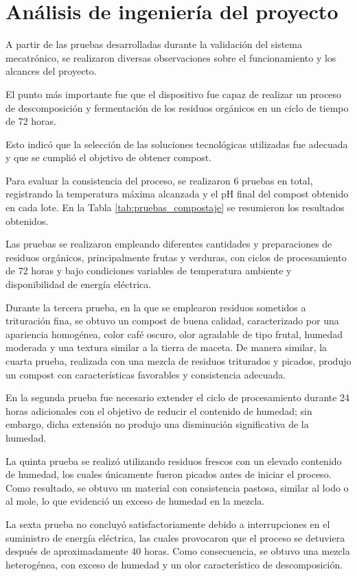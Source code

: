 \section{Análisis de ingeniería del proyecto}

A partir de las pruebas desarrolladas durante la validación del sistema mecatrónico, se realizaron diversas observaciones sobre el funcionamiento y los alcances del proyecto.

El punto más importante fue que el dispositivo fue capaz de realizar un proceso de descomposición y fermentación de los residuos orgánicos en un ciclo de tiempo de 72 horas.

Esto indicó que la selección de las soluciones tecnológicas utilizadas fue adecuada y que se cumplió el objetivo de obtener compost.

Para evaluar la consistencia del proceso, se realizaron 6 pruebas en total, registrando la temperatura máxima alcanzada y el pH final del compost obtenido en cada lote. En la Tabla \ref{tab:pruebas_compostaje} se resumieron los resultados obtenidos.
\clearpage

Las pruebas se realizaron empleando diferentes cantidades y preparaciones de residuos orgánicos, principalmente frutas y verduras, con ciclos de procesamiento de 72 horas y bajo condiciones variables de temperatura ambiente y disponibilidad de energía eléctrica.

Durante la tercera prueba, en la que se emplearon residuos sometidos a trituración fina, se obtuvo un compost de buena calidad, caracterizado por una apariencia homogénea, color café oscuro, olor agradable de tipo frutal, humedad moderada y una textura similar a la tierra de maceta. De manera similar, la cuarta prueba, realizada con una mezcla de residuos triturados y picados, produjo un compost con características favorables y consistencia adecuada.

En la segunda prueba fue necesario extender el ciclo de procesamiento durante 24 horas adicionales con el objetivo de reducir el contenido de humedad; sin embargo, dicha extensión no produjo una disminución significativa de la humedad.

La quinta prueba se realizó utilizando residuos frescos con un elevado contenido de humedad, los cuales únicamente fueron picados antes de iniciar el proceso. Como resultado, se obtuvo un material con consistencia pastosa, similar al lodo o al mole, lo que evidenció un exceso de humedad en la mezcla.

La sexta prueba no concluyó satisfactoriamente debido a interrupciones en el suministro de energía eléctrica, las cuales provocaron que el proceso se detuviera después de aproximadamente 40 horas. Como consecuencia, se obtuvo una mezcla heterogénea, con exceso de humedad y un olor característico de descomposición.

